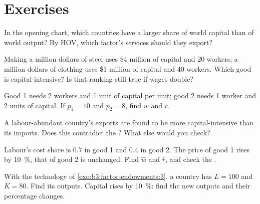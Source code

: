 \section{Exercises}\label{sec:b3:factor-endowments:exercises}

\begin{exercise}[$\star$]\label{exo:b3:factor-endowments:1}
In the opening chart, which countries have a larger share of world capital
than of world output? By HOV, which factor's services should they export?
\end{exercise}

\begin{exercise}[$\star$]\label{exo:b3:factor-endowments:2}
Making a million dollars of steel uses \$4 million of capital and 20 workers;
a million dollars of clothing uses \$1 million of capital and 40 workers. Which
good is capital-intensive? Is that ranking still true if wages double?
\end{exercise}

\begin{exercise}[$\star$]\label{exo:b3:factor-endowments:3}
Good 1 needs 2 workers and 1 unit of capital per unit; good 2 needs 1 worker and 2
units of capital. If $p_1 = 10$ and $p_2 = 8$, find $w$ and $r$.
\end{exercise}

\begin{exercise}[$\star$]\label{exo:b3:factor-endowments:4}
A labour-abundant country's exports are found to be more capital-intensive than
its imports. Does this contradict the ? What else would you
check?
\end{exercise}

\begin{exercise}[$\star\star$]\label{exo:b3:factor-endowments:5}
Labour's cost share is 0.7 in good 1 and 0.4 in good 2. The price of good 1 rises
by 10~\%, that of good 2 is unchanged. Find $\hat w$ and $\hat r$, and check the
.
\end{exercise}

\begin{exercise}[$\star\star$]\label{exo:b3:factor-endowments:6}
With the technology of \cref{exo:b3:factor-endowments:3}, a country has $L = 100$
and $K = 80$. Find its outputs. Capital rises by 10~\%: find the new outputs and
their percentage changes.
\end{exercise}


